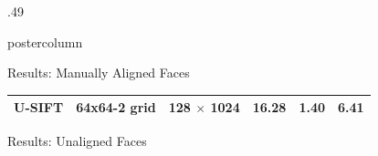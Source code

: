 \documentclass[final,hyperref={pdfpagelabels=false}]{beamer}
\begin{document}
\begin{frame}
\begin{columns}
\begin{column}{.49\textwidth}
\begin{beamercolorbox}[center,wd=\textwidth]{postercolumn}
\begin{minipage}[T]{.95\textwidth}
{\begin{block}{Results: Manually Aligned Faces}
\begin{table}
\begin{tabular}{@{} p{.2\linewidth} p{.18\linewidth} p{.25\linewidth} r r r @{}}
                  U-SIFT     & 64x64-2 grid  & 128 $\times$ 1024                                    & 16.28         &  1.40             & 6.41      \\
                  \bottomrule
                \end{tabular}
              \end{table}              
            \end{block}
            \vfill
            \begin{block}{Results: Unaligned Faces}
              \begin{columns}
\end{columns}
\end{block}}
\end{minipage}
\end{beamercolorbox}
\end{column}
\end{columns}
\end{frame}
\end{document}
